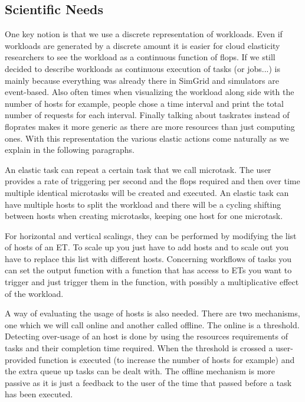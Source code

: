 \documentclass[a4paper, onecolumn, 11pt]{article}
\begin{document}
  \subsection{Scientific Needs}
  One key notion is that we use a discrete representation of workloads. Even if
  workloads are generated by a discrete amount it is easier for cloud elasticity
  researchers to see the workload as a continuous function of flops. If we still
  decided to describe workloads as continuous execution of tasks (or jobs...) is
  mainly because everything was already there in SimGrid and simulators are
  event-based. Also often times when visualizing the workload along side with
  the number of hosts for example, people chose a time interval and print the
  total number of requests for each interval. Finally talking about taskrates
  instead of floprates makes it more generic as there are more resources than
  just computing ones. With this representation the various elastic actions come
  naturally as we explain in the following paragraphs.
  
  An elastic task can repeat a certain task that we call microtask. The user
  provides a rate of triggering per second and the flops required and then over
  time multiple identical microtasks will be created and executed. An elastic
  task can have multiple hosts to split the workload and there will be a cycling
  shifting between hosts when creating microtasks, keeping one host for one
  microtask.
  
  For horizontal and vertical scalings, they can be performed by modifying the
  list of hosts of an ET. To scale up you just have to add hosts and to scale
  out you have to replace this list with different hosts. Concerning workflows
  of tasks you can set the output function with a function that has access to
  ETs you want to trigger and just trigger them in the function, with possibly a
  multiplicative effect of the workload.
  
  A way of evaluating the usage of hosts is also needed. There are two
  mechanisms, one which we will call online and another called offline. The
  online is a threshold. Detecting over-usage of an host is done by using the
  resources requirements of tasks and their completion time required. When the
  threshold is crossed a user-provided function is executed (to increase the
  number of hosts for example) and the extra queue up tasks can be dealt with.
  The offline mechanism is more passive as it is just a feedback to the user of
  the time that passed before a task has been executed.
  
\end{document}
